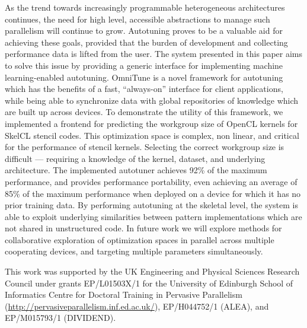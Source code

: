 \documentclass[nonatbib,preprint,nocopyrightspace,9pt]{sigplanconf}
\begin{document}
As the trend towards increasingly programmable heterogeneous
architectures continues, the need for high level, accessible
abstractions to manage such parallelism will continue to
grow. Autotuning proves to be a valuable aid for achieving these
goals, provided that the burden of development and collecting
performance data is lifted from the user. The system presented in this
paper aims to solve this issue by providing a generic interface for
implementing machine learning-enabled autotuning. OmniTune is a novel
framework for autotuning which has the benefits of a fast,
``always-on'' interface for client applications, while being able to
synchronize data with global repositories of knowledge which are built
up across devices. To demonstrate the utility of this framework, we
implemented a frontend for predicting the workgroup size of OpenCL
kernels for SkelCL stencil codes. This optimization space is complex,
non linear, and critical for the performance of stencil
kernels. Selecting the correct workgroup size is difficult ---
requiring a knowledge of the kernel, dataset, and underlying
architecture. The implemented autotuner achieves 92\% of the maximum
performance, and provides performance portability, even achieving an
average of 85\% of the maximum performance when deployed on a device
for which it has no prior training data. By performing autotuning at
the skeletal level, the system is able to exploit underlying
similarities between pattern implementations which are not shared in
unstructured code. In future work we will explore methods for
collaborative exploration of optimization spaces in parallel across
multiple cooperating devices, and targeting multiple parameters
simultaneously.

\acks

This work was supported by the UK Engineering and Physical Sciences
Research Council under grants EP/L01503X/1 for the University of
Edinburgh School of Informatics Centre for Doctoral Training in
Pervasive Parallelism
(\url{http://pervasiveparallelism.inf.ed.ac.uk/}), EP/H044752/1
(ALEA), and EP/M015793/1 (DIVIDEND).

\label{bibliography}
\printbibliography
\end{document}

